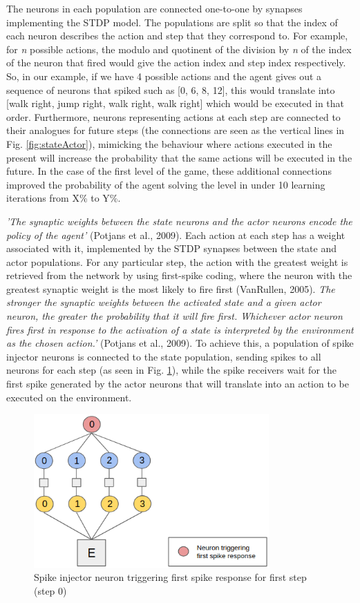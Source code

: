 \documentclass[10pt]{article}
\begin{document}
    The neurons in each population are connected one-to-one by synapses implementing the STDP model. The populations are split so that the index of each neuron describes the action and step that they correspond to. For example, for \textit{n} possible actions, the modulo and quotinent of the division by \textit{n} of the index of the neuron that fired would give the action index and step index respectively. So, in our example, if we have 4 possible actions and the agent gives out a sequence of neurons that spiked such as [0, 6, 8, 12], this would translate into [walk right, jump right, walk right, walk right] which would be executed in that order. Furthermore, neurons representing actions at each step are connected to their analogues for future steps (the connections are seen as the vertical lines in Fig. \ref{fig:stateActor}), mimicking the behaviour where actions executed in the present will increase the probability that the same actions will be executed in the future. In the case of the first level of the game, these additional connections improved the probability of the agent solving the level in under 10 learning iterations from X\% to Y\%.

    \textit{'The synaptic weights between the state neurons and the actor neurons encode the policy of the agent'} (Potjans et al., 2009). Each action at each step has a weight associated with it, implemented by the STDP synapses between the state and actor populations. For any particular step, the action with the greatest weight is retrieved from the network by using first-spike coding, where the neuron with the greatest synaptic weight is the most likely to fire first (VanRullen, 2005). \textit{The stronger the synaptic weights between the activated state and a given actor
    neuron, the greater the probability that it will fire first. Whichever actor
    neuron fires first in response to the activation of a state is interpreted by
    the environment as the chosen action.'} (Potjans et al., 2009). To achieve this, a population of spike injector neurons is connected to the state population, sending spikes to all neurons for each step (as seen in Fig. \ref{fig:firstSpike}), while the spike receivers wait for the first spike generated by the actor neurons that will translate into an action to be executed on the environment.

    \begin{figure}[ht!]
    \centering
    \includegraphics[width=90mm]{./firstSpike.png}
    \caption{Spike injector neuron triggering first spike response for first step (step 0) \label{overflow}}
    \label{fig:firstSpike}
    \end{figure}
\end{document}
